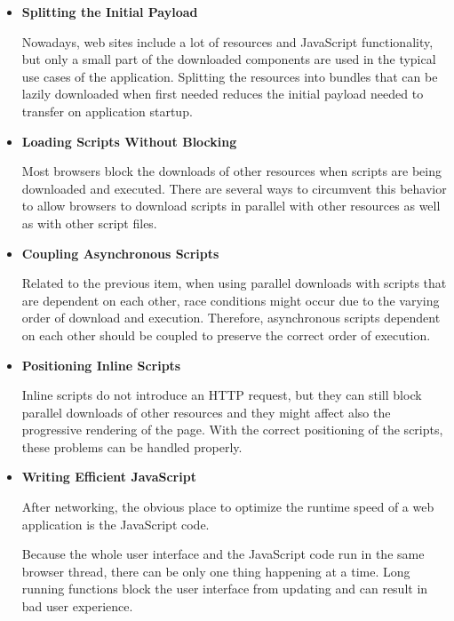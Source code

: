 \begin{itemize}


\item \textbf{Splitting the Initial Payload}

  Nowadays, web sites include a lot of resources and JavaScript
  functionality, but only a small part of the downloaded components
  are used in the typical use cases of the application. Splitting the
  resources into bundles that can be lazily downloaded when first
  needed reduces the initial payload needed to transfer on application
  startup.

\item \textbf{Loading Scripts Without Blocking}

  Most browsers block the downloads of other resources when scripts
  are being downloaded and executed. There are several ways to
  circumvent this behavior to allow browsers to download scripts in
  parallel with other resources as well as with other script files.

\item \textbf{Coupling Asynchronous Scripts}

  Related to the previous item, when using parallel downloads with
  scripts that are dependent on each other, race conditions might
  occur due to the varying order of download and execution. Therefore,
  asynchronous scripts dependent on each other should be coupled to
  preserve the correct order of execution.

\item \textbf{Positioning Inline Scripts}

  Inline scripts do not introduce an HTTP request, but they can still
  block parallel downloads of other resources and they might affect
  also the progressive rendering of the page. With the correct
  positioning of the scripts, these problems can be handled properly.

\item \textbf{Writing Efficient JavaScript}

  After networking, the obvious place to optimize the runtime speed of
  a web application is the JavaScript code.

  Because the whole user interface and the JavaScript code run in the
  same browser thread, there can be only one thing happening at a
  time. Long running functions block the user interface from updating
  and can result in bad user experience.


\end{itemize}
